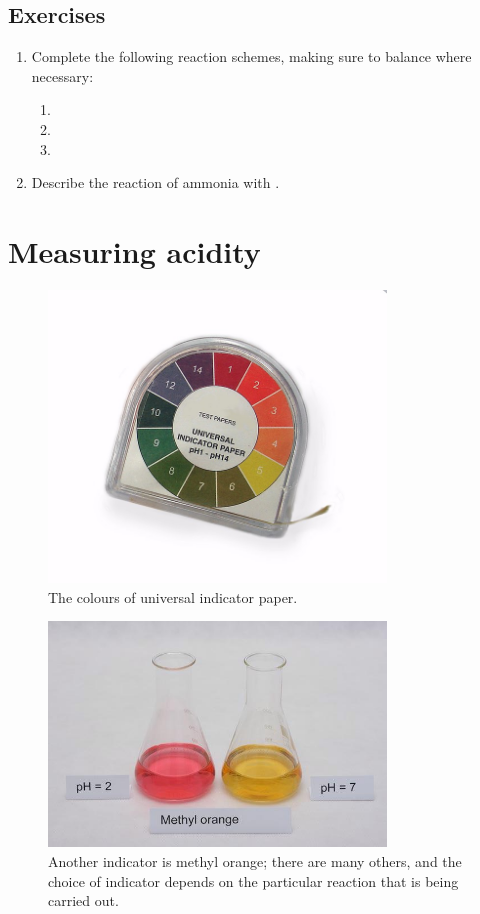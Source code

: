 \documentclass[a4paper]{memoir}
\begin{document}
\subsection*{Exercises}
\begin{enumerate}
  \item Complete the following reaction schemes, making sure to balance where necessary:
    \begin{enumerate}
      \item {}
      \item {}
      \item {}
    \end{enumerate}
  \item Describe the reaction of ammonia with .
\end{enumerate}

\section{Measuring acidity}
\begin{figure}
  \centering
  \includegraphics[width=0.8\textwidth]{univindic}
  \caption{The colours of universal indicator paper.\label{fig:univindic}}
\end{figure}

\begin{figure}
  \centering
  \includegraphics[width=0.8\textwidth]{methylorange}
  \caption{Another indicator is methyl orange; there are many others, and the choice of indicator depends on the particular
           reaction that is being carried out.\label{fig:methylorange}}
\end{figure}
\end{document}
